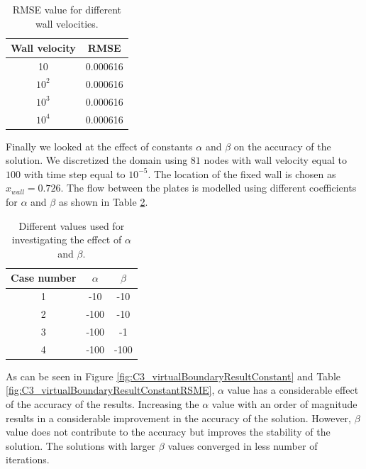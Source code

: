 \begin{table}[H]
\centering
\begin{tabular}{c | c}
	 Wall velocity & RMSE \\ \hline \hline
	 10 & 0.000616\\ \hline
	 $10^2$ & 0.000616 \\ \hline
	 $10^3$ & 0.000616 \\ \hline
	 $10^4$ & 0.000616 \\
\end{tabular}
\caption{RMSE value for different wall velocities.}
\label{table:C3_virtualBoundaryResultWallVelocityRMSE}
\end{table}

Finally we looked at the effect of constants $\alpha$ and $\beta$ on the accuracy of the solution. We discretized the domain using $81$ nodes with wall velocity equal to $100$ with time step equal to $10^{-5}$. The location of the fixed wall is chosen as $x_{wall} = 0.726$. The flow between the plates is modelled using different coefficients for $\alpha$ and $\beta$ as shown in Table \ref{table:C3_alphaBetaValues}.

\begin{table}[H]
\centering
\begin{tabular}{c | c | c}
	 Case number & $\alpha$ & $\beta$ \\ \hline \hline
	 1 & -10 & -10 \\ \hline
	 2 & -100 & -10 \\ \hline
	 3 & -100 & -1 \\ \hline
	 4 & -100 & -100 \\
\end{tabular}
\caption{Different values used for investigating the effect of $\alpha$ and $\beta$.}
\label{table:C3_alphaBetaValues}
\end{table}

As can be seen in Figure \ref{fig:C3_virtualBoundaryResultConstant} and Table \ref{fig:C3_virtualBoundaryResultConstantRSME}, $\alpha$ value has a considerable effect of the accuracy of the results. Increasing the $\alpha$ value with an order of magnitude results in a considerable improvement in the accuracy of the solution. However, $\beta$ value does not contribute to the accuracy but improves the stability of the solution. The solutions with larger $\beta$ values converged in less number of iterations.

